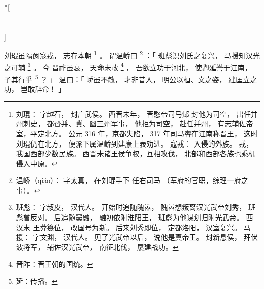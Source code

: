 
\switchcolumn[0]*[\section{}]

刘琨虽隔阂寇戎，
志存本朝%
\footnote{%
    刘琨：
        字越石，
        封广武侯。
        西晋未年，
        晋愍帝司马邺
        封他为司空，
        出任并州刺史，
        都督并、冀、幽三州军事，
        他拒为司空，
        赴任并州，
        有志辅佐帝室，平定北方。
        公元 316 年，京都失陷，
        317 年司马睿在江南称晋王，
        这时刘琨仍在北方，
        便派下属温峤到建康上表劝进。
    寇戎：
        入侵的外族。
        戎，我国西部少数民族。
        西晋未诸王侯争权，互相攻伐，
        北部和西部各族也乘机侵入中原。
}%
。
谓温峤曰%
\footnote{%
    温峤（qiáo）：
        字太真，
        在刘琨手下
        任右司马
        （军府的官职，综理一府之事）。
}%
：「
    班彪识刘氏之复兴，
    马援知汉光之可辅%
    \footnote{%
        班彪：
            字叔皮，
            汉代人。
            开始时追随隗嚣，
            隗嚣想叛离汉光武帝刘秀，
            班彪曾反对。
            后追随窦融，
            融初依附淮阳王，
            班彪为他谋划归附光武帝。
            西汉末
            王莽篡位，
            改国号为新。
            后来刘秀即位，
            定都洛阳，
            汉室复兴。
        马援：
            字文渊，
            汉代人。
            见了光武帝以后，
            说他是真帝王。
            封新息侯，
            拜伏波将军，
            辅佐汉光武帝，
            南征北伐，
            屡建战功。
    }%
    。
    今
    晋祚虽衰，
    天命未改%
    \footnote{%
        晋阼：晋王朝的国统。
    }%
    ，
    吾欲立功于河北，
    使卿延誉于江南，
    子其行乎%
    \footnote{%
        延：传播。
    }%
    ？
」
温曰：「
    峤虽不敏，
    才非昔人，
    明公以桓、文之姿，
    建匡立之功，
    岂敢辞命！
」

\switchcolumn


